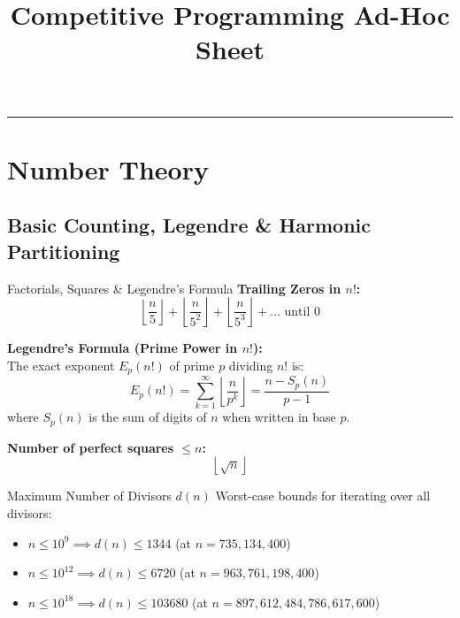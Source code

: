 \documentclass[10pt]{article}
\title{\vspace{-1.5em}\textbf{\LARGE Competitive Programming Ad-Hoc Sheet}\vspace{-0.5em}}
\author{}
\date{}
\begin{document}
\maketitle
\tableofcontents
\vspace{0.8em}
\hrule
\vspace{0.8em}


\section{Number Theory}

\subsection{Basic Counting, Legendre \& Harmonic Partitioning}

\begin{conceptbox}{Factorials, Squares \& Legendre's Formula}
    \textbf{Trailing Zeros in $n!$:}
    \[
        \left\lfloor\frac{n}{5}\right\rfloor + \left\lfloor\frac{n}{5^2}\right\rfloor + \left\lfloor\frac{n}{5^3}\right\rfloor + \ldots \text{ until } 0
    \]

    \textbf{Legendre's Formula (Prime Power in $n!$):} \\
    The exact exponent $E_p(n!)$ of prime $p$ dividing $n!$ is:
    \[ E_p(n!) = \sum_{k=1}^{\infty} \left\lfloor \frac{n}{p^k} \right\rfloor = \frac{n - S_p(n)}{p - 1} \]
    where $S_p(n)$ is the sum of digits of $n$ when written in base $p$.

    \textbf{Number of perfect squares $\leq n$:}
    \[ \left\lfloor\sqrt{n}\right\rfloor \]
\end{conceptbox}

\begin{conceptbox}{Maximum Number of Divisors $d(n)$}
    Worst-case bounds for iterating over all divisors:
    \begin{itemize}
        \item $n \le 10^9 \implies d(n) \le 1344$ (at $n = 735{,}134{,}400$)
        \item $n \le 10^{12} \implies d(n) \le 6720$ (at $n = 963{,}761{,}198{,}400$)
        \item $n \le 10^{18} \implies d(n) \le 103680$ (at $n = 897{,}612{,}484{,}786{,}617{,}600$)
    \end{itemize}
\end{conceptbox}
\end{document}

